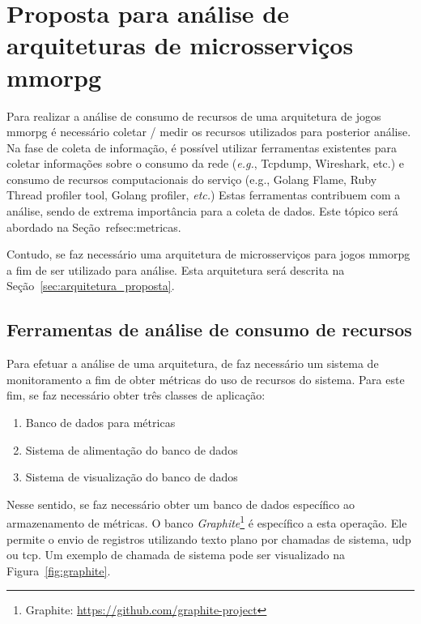 \chapter{Proposta para análise de arquiteturas de microsserviços \ac{mmorpg}}
\label{cap3}

Para realizar a análise de consumo de recursos de uma arquitetura de jogos \ac{mmorpg} é necessário coletar / medir os recursos utilizados para posterior análise.
%
Na fase de coleta de informação, é possível utilizar ferramentas existentes para coletar informações sobre o consumo da rede (\textit{e.g.}, Tcpdump, Wireshark, etc.) e consumo de recursos computacionais do serviço (e.g., Golang Flame, Ruby Thread profiler tool, Golang profiler, \textit{etc.})
%
Estas ferramentas contribuem com a análise, sendo de extrema importância para a coleta de dados.
%
Este tópico será abordado na Seção~ref{sec:metricas}.



Contudo, se faz necessário uma arquitetura de microsserviços para jogos \ac{mmorpg} a fim de ser utilizado para análise.
%
Esta arquitetura será descrita na Seção~\ref{sec:arquitetura_proposta}.


\section{Ferramentas de análise de consumo de recursos}
\label{sec:metricas}


Para efetuar a análise de uma arquitetura, de faz necessário um sistema de monitoramento a fim de obter métricas do uso de recursos do sistema.
%
Para este fim, se faz necessário obter três classes de aplicação:


\begin{enumerate}
  \item Banco de dados para métricas
  \item Sistema de alimentação do banco de dados
  \item Sistema de visualização do banco de dados
\end{enumerate}

Nesse sentido, se faz necessário obter um banco de dados específico ao armazenamento de métricas.
%
O banco \textit{Graphite}\footnote{Graphite: \url{https://github.com/graphite-project}} é específico a esta operação.
%
Ele permite o envio de registros utilizando texto plano por chamadas de sistema, \ac{udp} ou \ac{tcp}.
%
Um exemplo de chamada de sistema pode ser visualizado na Figura~\ref{fig:graphite}.

